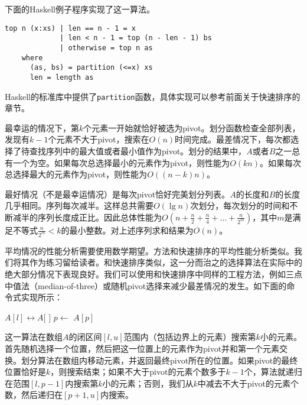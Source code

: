 \documentclass[UTF8]{article}
\begin{document}
下面的Haskell例子程序实现了这一算法。

\lstset{language=Haskell}
\begin{lstlisting}
top n (x:xs) | len == n - 1 = x
             | len < n - 1 = top (n - len - 1) bs
             | otherwise = top n as
    where
      (as, bs) = partition (<=x) xs
      len = length as
\end{lstlisting}

Haskell的标准库中提供了\texttt{partition}函数，具体实现可以参考前面关于快速排序的章节。

最幸运的情况下，第$k$个元素一开始就恰好被选为pivot。划分函数检查全部列表，发现有$k-1$个元素不大于pivot，搜索在$O(n)$时间完成。最差情况下，每次都选择了待查找序列中的最大值或者最小值作为pivot。划分的结果中，$A$或者$B$之一总有一个为空。如果每次总选择最小的元素作为pivot，则性能为$O(kn)$。如果每次总选择最大的元素作为pivot，则性能为$O((n-k)n)$。

最好情况（不是最幸运情况）是每次pivot恰好完美划分列表。$A$的长度和$B$的长度几乎相同。序列每次减半。这样总共需要$O(\lg n)$次划分，每次划分的时间和不断减半的序列长度成正比。因此总体性能为$O(n + \frac{n}{2} + \frac{n}{4} + ... + \frac{n}{2^m})$，其中$m$是满足不等式$\frac{n}{2^m} < k$的最小整数。对上述序列求和结果为$O(n)$。

平均情况的性能分析需要使用数学期望。方法和快速排序的平均性能分析类似。我们将其作为练习留给读者。和快速排序类似，这一分而治之的选择算法在实际中的绝大部分情况下表现良好。我们可以使用和快速排序中同样的工程方法，例如三点中值法（median-of-three）或随机pivot选择来减少最差情况的发生。如下面的命令式实现所示：

\begin{algorithmic}[1]
  \State {} $A[l] \leftrightarrow A[$  $]$ 
  \State $p \gets$ 
    \State \Return $A[p]$
  \EndIf
    \State \Return {}
  \EndIf
  \State \Return {}
\EndFunction
\end{algorithmic}

这一算法在数组$A$的闭区间$[l, u]$范围内（包括边界上的元素）搜索第$k$小的元素。首先随机选择一个位置，然后把这一位置上的元素作为pivot并和第一个元素交换。划分算法在数组内移动元素，并返回最终pivot所在的位置。如果pivot的最终位置恰好是$k$，则搜索结束；如果不大于pivot的元素个数多于$k-1$个，算法就递归在范围$[l, p-1]$内搜索第$k$小的元素；否则，我们从$k$中减去不大于pivot的元素个数，然后递归在$[p+1, u]$内搜索。
\end{document}
